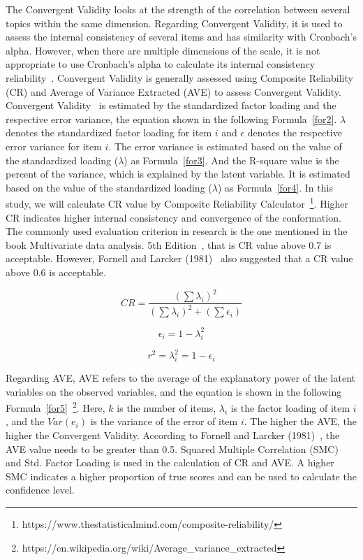 The Convergent Validity looks at the strength of the correlation between several topics within the same dimension. 
Regarding Convergent Validity, it is used to assess the internal consistency of several items and has similarity with Cronbach's alpha. However, when there are multiple dimensions of the scale, it is not appropriate to use Cronbach's alpha to calculate its internal consistency reliability~\cite{ref29,ref30}. Convergent Validity is generally assessed using Composite Reliability (CR) and Average of Variance Extracted (AVE) to assess Convergent Validity. Convergent Validity~\cite{ref33} is estimated by the standardized factor loading and the respective error variance, the equation shown in the following Formula~\ref{for2}. $\lambda$ denotes the standardized factor loading for item $i$ and $\epsilon$ denotes the respective error variance for item $i$. The error variance is estimated based on the value of the standardized loading ($\lambda$) as Formula~\ref{for3}. And the R-square value is the percent of the variance, which is explained by the latent variable. It is estimated based on the value of the standardized loading ($\lambda$) as Formula~\ref{for4}. In this study, we will calculate CR value by Composite Reliability Calculator~\footnote{https://www.thestatisticalmind.com/composite-reliability/}. Higher CR indicates higher internal consistency and convergence of the conformation. The commonly used evaluation criterion in research is the one mentioned in the book Multivariate data analysis. 5th Edition~\cite{ref32}, that is CR value above 0.7 is acceptable. However, Fornell and Larcker (1981)~\cite{ref31} also suggested that a CR value above 0.6 is acceptable. 

\begin{equation}
\label{for2}
CR=\frac{(\sum \lambda_i )^2}{(\sum \lambda_i )^2+(\sum \epsilon _i )}
\end{equation}

\begin{equation}
\label{for3}
\epsilon_i = 1-\lambda_i^2  
\end{equation}

\begin{equation}
\label{for4}
r^2 = \lambda_i^2 = 1- \epsilon_i  
\end{equation}

Regarding AVE, AVE refers to the average of the explanatory power of the latent variables on the observed variables, and the equation is shown in the following Formula~\ref{for5}~\footnote{https://en.wikipedia.org/wiki/Average\_variance\_extracted}. Here, $k$ is the number of items, $\lambda_i$ is the factor loading of item $i$, and the $Var(e_i)$ is the variance of the error of item $i$. The higher the AVE, the higher the Convergent Validity. According to Fornell and Larcker (1981)~\cite{ref31}, the AVE value needs to be greater than 0.5. Squared Multiple Correlation (SMC) and Std. Factor Loading is used in the calculation of CR and AVE. A higher SMC indicates a higher proportion of true scores and can be used to calculate the confidence level.

